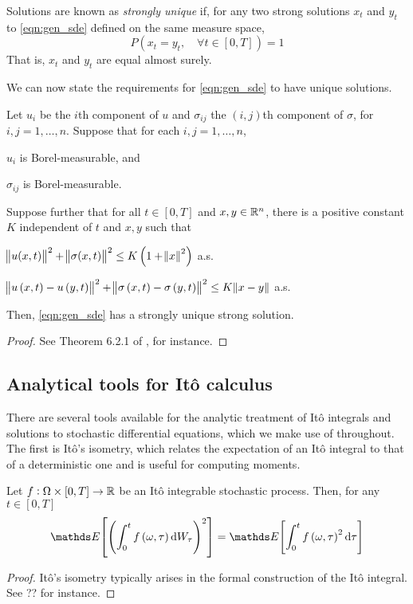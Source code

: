 Solutions are known as \emph{strongly unique} if, for any two strong solutions \(x_t\) and \(y_t\) to \eqref{eqn:gen_sde} defined on the same measure space,
\[
	P\left(x_t = y_t, \quad \forall t \in \left[0,T\right]\right) = 1
\]
That is, \(x_t\) and \(y_t\) are equal almost surely.

We can now state the requirements for \eqref{eqn:gen_sde} to have unique solutions.
\begin{theorem}
	Let \(u_i\) be the \(i\)th component of \(u\) and \(\sigma_{ij}\) the \((i,j)\)th component of \(\sigma\), for \(i,j = 1,\hdots,n\).
	Suppose that for each \(i,j = 1,\hdots,n\),
	\begin{romanate}
		\item \(u_i\) is Borel-measurable, and
		\item \(\sigma_{ij}\) is Borel-measurable.
	\end{romanate}
	Suppose further that for all \(t \in [0,T]\) and \(x,y \in \mathbb{R}^n\), there is a positive constant \(K\) independent of \(t\) and \(x, y\) such that
	\begin{romanate}
		\setcounter{enumi}{2}
		\item \(\norm{u(x,t)}^2 + \norm{\sigma(x,t)}^2 \leq K\left(1 + \norm{x}^2\right)\) a.s.
		\item \(\norm{u\left(x,t\right) - u\left(y,t\right)}^2 + \norm{\sigma\left(x,t\right) - \sigma\left(y,t\right)}^2 \leq K\norm{x - y}\) a.s.
	\end{romanate}
	Then, \eqref{eqn:gen_sde} has a strongly unique strong solution.
\end{theorem}
\begin{proof}
	See Theorem 6.2.1 of \cite{KallianpurSundar_2014_StochasticAnalysisDiffusion}, for instance.
\end{proof}



\subsection{Analytical tools for It\^o calculus}
There are several tools available for the analytic treatment of It\^o integrals and solutions to stochastic differential equations, which we make use of throughout.
The first is It\^o's isometry, which relates the expectation of an It\^o integral to that of a deterministic one and is useful for computing moments.
\begin{theorem}[It\^o's Isometry]\label{thm:ito_isom}
	Let \(f: \Omega \times [0,T] \to \mathbb{R}\) be an It\^o integrable stochastic process.
	Then, for any \(t \in [0,T]\)
	\[
		\avg{\left(\int_0^t{f\left(\omega, \tau\right)\dif W_\tau}\right)^2} = \avg{\int_0^t{f\left(\omega, \tau\right)^2\dif\tau}}
	\]
\end{theorem}
\begin{proof}
	It\^o's isometry typically arises in the formal construction of the It\^o integral.
	See ?? for instance.
\end{proof}

